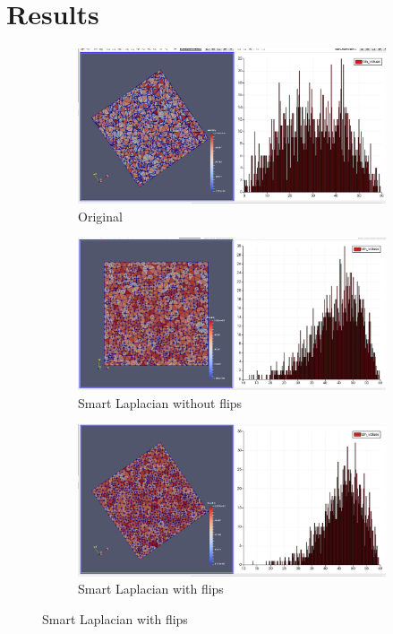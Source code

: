 \chapter{Results}

\begin{figure}[h]
    \centering
    \begin{subfigure}[h]{1.0\textwidth}
        \centering
        \includegraphics[width=\textwidth]{images/original_1000.png}
        \caption{Original}
    \end{subfigure}
    \vspace{0.5 cm}
 
    \begin{subfigure}[h]{1.0\textwidth}
        \centering
        \includegraphics[width=\textwidth]{images/laplacian_no_flips_1000.png}
        \caption{Smart Laplacian without flips}
    \end{subfigure}
    \vspace{0.5 cm}
 
    \begin{subfigure}[h]{1.0\textwidth}
        \centering
        \includegraphics[width=\textwidth]{images/laplacian_1000.png}
        \caption{Smart Laplacian with flips}
    \end{subfigure}
	\vspace{0.5 cm}
\end{figure}

